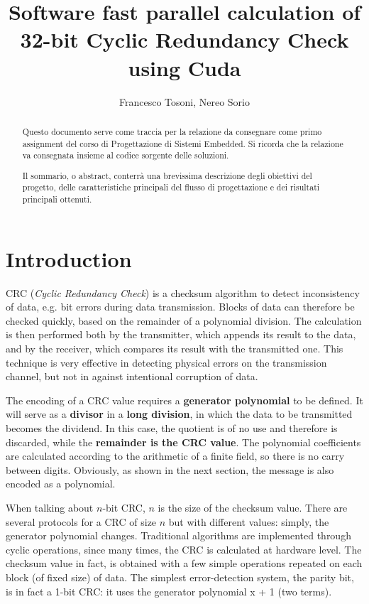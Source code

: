 \documentclass[]{IEEEtran}
\title{Software fast parallel calculation of 32-bit Cyclic Redundancy Check using Cuda}
\author{Francesco Tosoni, Nereo Sorio}
\begin{document}
\maketitle

\begin{abstract}
Questo documento serve come traccia per la relazione da consegnare come primo assignment del corso di Progettazione di Sistemi Embedded. Si ricorda che la relazione va consegnata insieme al codice sorgente delle soluzioni.

Il sommario, o abstract, conterr\`a una brevissima descrizione degli obiettivi del progetto, delle caratteristiche principali del flusso di progettazione e dei risultati principali ottenuti. 
\end{abstract}


\section{Introduction}

CRC (\emph{Cyclic Redundancy Check}) is a checksum algorithm to detect inconsistency of data, e.g. bit errors during data transmission. Blocks of data can therefore be checked quickly, based on the remainder of a polynomial division. The calculation is then performed both by the transmitter, which appends its result to the data, and by the receiver, which compares its result with the transmitted one. This technique is very effective in detecting physical errors on the transmission channel, but not in against intentional corruption of data. 

The encoding of a CRC value requires a \textbf{generator polynomial} to be defined. It will serve as a \textbf{divisor} in a \textbf{long division}, in which the data to be transmitted becomes the dividend. In this case, the quotient is of no use and therefore is discarded, while the \textbf{remainder is the CRC value}. 
The polynomial coefficients are calculated according to the arithmetic of a finite field, so there is no carry between digits. Obviously, as shown in the next section, the message is also encoded as a polynomial. 

When talking about $n$-bit CRC, $n$ is the size of the checksum value. There are several protocols for a CRC of size $n$ but with different values: simply, the generator polynomial changes. 
Traditional algorithms are implemented through cyclic operations, since many times, the CRC is calculated at hardware level. The checksum value in fact, is obtained with a few simple operations repeated on each block (of fixed size) of data. 
The simplest error-detection system, the parity bit, is in fact a 1-bit CRC: it uses the generator polynomial x + 1 (two terms).
\end{document}
